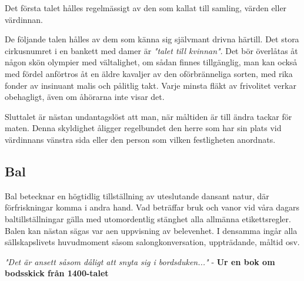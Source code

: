 Det första talet hålles regelmässigt av den som kallat till samling, värden eller värdinnan.

De följande talen hålles av dem som känna sig självmant drivna härtill. Det stora cirkusnumret i en bankett med damer är \textit{"talet till kvinnan"}. Det bör överlåtas åt någon skön olympier med vältalighet, om sådan finnes tillgänglig, man kan också med fördel anförtros åt en äldre kavaljer av den oförbränneliga sorten, med rika fonder av insinuant malis och pålitlig takt. Varje minsta fläkt av frivolitet verkar obehagligt, även om åhörarna inte visar det.

Sluttalet är nästan undantagslöst att man, när måltiden är till ändra tackar för maten. Denna skyldighet åligger regelbundet den herre som har sin plats vid värdinnans vänstra sida eller den person som vilken festligheten anordnats.

\subsection{Bal}
Bal betecknar en högtidlig tillställning av uteslutande dansant natur, där förfriskningar komma i andra hand. Vad beträffar bruk och vanor vid våra dagars baltillställningar gälla med utomordentlig stänghet alla allmänna etikettsregler. Balen kan nästan sägas var aen uppvisning av belevenhet. I densamma ingår alla sällskapslivets huvudmoment såsom salongkonversation, uppträdande, måltid osv.

\textit{"Det är ansett såsom dåligt att snyta sig i bordsduken..."} - \textbf{Ur en bok om bodsskick från 1400-talet}
\newpage